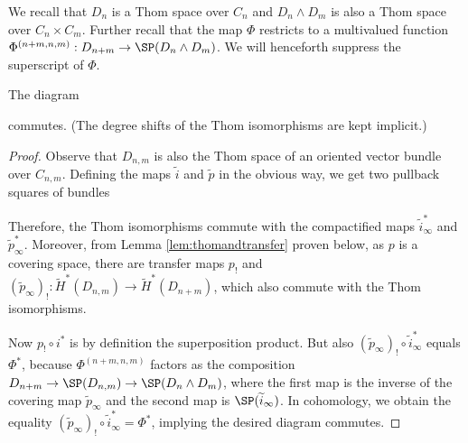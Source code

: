 We recall that $D_n$ is a Thom space over $C_n$ and $D_n\wedge D_m$ is also a Thom space over $C_n\times C_m$. Further recall that the map $\Phi$ restricts to a multivalued function $\Phi^{(n+m,n,m)}:D_{n+m}\to \SP(D_n\wedge D_m)$. We will henceforth suppress the superscript of $\Phi$.
\begin{proposition}\label{Prop:supcommuteswithPhi}
    The diagram 
    \begin{center}
    \end{center}
    commutes. (The degree shifts of the Thom isomorphisms are kept implicit.)
\end{proposition}
\begin{proof}
     Observe that $D_{n,m}$ is also the Thom space of an oriented vector bundle over $C_{n,m}$. Defining the maps $\widetilde{i}$ and $\widetilde{p}$ in the obvious way, we get two pullback squares of bundles
     \begin{center}
\end{center}
Therefore, the Thom isomorphisms commute with the compactified maps $\widetilde{i}^*_{\infty}$
and $\widetilde{p}^*_{\infty}$. Moreover, from Lemma \ref{lem:thomandtransfer} proven below, as $p$ is a covering space, there are transfer maps $p_!$ and $(\widetilde{p}_{\infty})_!:\widetilde{H}^*(D_{n,m})\to \widetilde{H}^*(D_{n+m})$, which also commute with the Thom isomorphisms.

Now ${p}_!\circ {i}^*$ is by definition the superposition product. But also $(\widetilde{p}_{\infty})_!\circ \widetilde{i}^*_{\infty}$ equals $\Phi^*$, because $\Phi^{(n+m,n,m)}$ factors as the composition $D_{n+m}\to \SP(D_{n,m})\to\SP( D_n\wedge D_m)$, where the first map is the inverse of the covering map $\widetilde{p}_{\infty}$ and the second map is $\SP(\widetilde{i}_{\infty})$. In cohomology, we obtain the equality $(\widetilde{p}_{\infty})_!\circ \widetilde{i}^*_{\infty}=\Phi^*$, implying the desired diagram commutes.
\end{proof}


